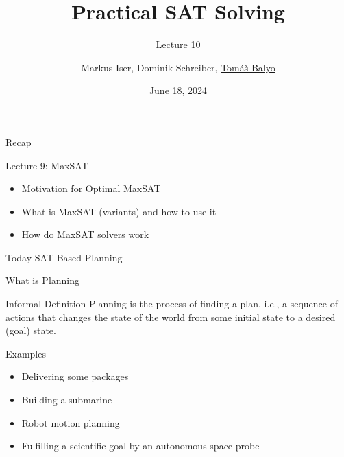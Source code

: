 \documentclass[t]{sdqbeamer}
\title[SAT Solving]{Practical SAT Solving}
\subtitle{Lecture 10}
\author{Markus Iser, Dominik Schreiber, \underline{Tom\'a\v{s} Balyo}}
\date{June 18, 2024}
\begin{document}
\begin{frame}
	\thispagestyle{empty}
	\titlepage
\end{frame}


\begin{frame}{Recap}
    \begin{block}{Lecture 9: MaxSAT}
		\begin{itemize}\setlength{\itemsep}{1ex}
			\item Motivation for Optimal MaxSAT
			\item What is MaxSAT (variants) and how to use it
			\item How do MaxSAT solvers work
		\end{itemize}
    \end{block}
	\begin{block}{Today}
        SAT Based Planning
	\end{block}
\end{frame}

\begin{frame}{What is Planning}
\begin{block}{Informal Definition}
Planning is the process of finding a plan, i.e., a sequence of actions that changes the
state of the world from some initial state to a desired (goal) state.
\end{block}
Examples
\begin{itemize}
	\item Delivering some packages
	\item Building a submarine
	\item Robot motion planning
	\item Fulfilling a scientific goal by an autonomous space probe
\end{itemize}
\end{frame}
\end{document}
